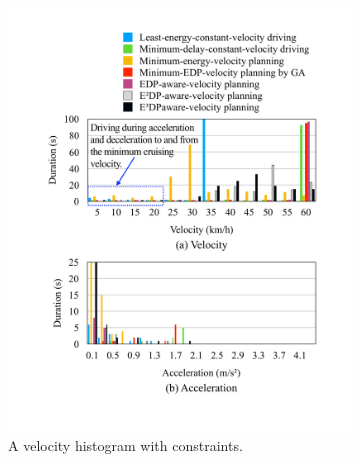 \documentclass[onecolumn]{IEEEconf}
\begin{document}
\begin{description}
\begin{figure}[h!]
\begin{subfigure}{0.45\textwidth}
	\includegraphics[width=\hsize]{Figures/Histogram_vel.pdf}
	\caption{A velocity histogram with constraints.}
	\label{fig:histogram_vel}
	\end{subfigure}
	\begin{subfigure}{0.45\textwidth}

\end{subfigure}
\end{figure}
\end{description}
\end{document}
